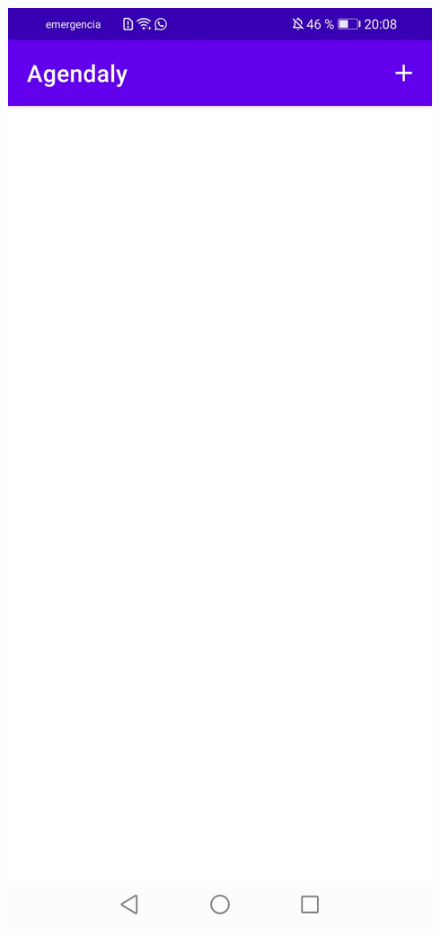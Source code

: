 \documentclass[a4paper,openright,12pt]{article}
\begin{document}
\begin{figure}
            \includegraphics[scale=0.05]{selectedemptyday.jpg}\hfill

\end{figure}
\end{document}
